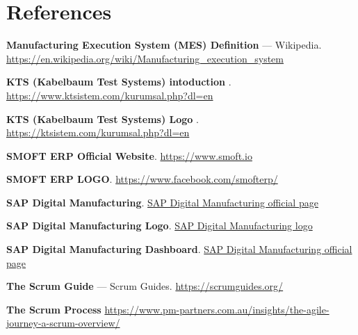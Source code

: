 \chapter*{References}

\begin{enumerate}[label={[\arabic*]},leftmargin=*]
    \item \label{ref:MESdefinition} \textbf{Manufacturing Execution System (MES) Definition} --- Wikipedia.
    \url{https://en.wikipedia.org/wiki/Manufacturing_execution_system}

    \item \label{ref:KTSintro} \textbf{KTS (Kabelbaum Test Systems) intoduction} .
    \url{https://www.ktsistem.com/kurumsal.php?dl=en}

    \item \label{ref:KTSlogo} \textbf{KTS (Kabelbaum Test Systems) Logo} .
    \url{https://ktsistem.com/kurumsal.php?dl=en}
    
    \item \label{ref:SMOFT} \textbf{SMOFT ERP Official Website}.
    \href{https://www.smoft.io}{https://www.smoft.io}

    \item \label{ref:SMOFT-LOGO} \textbf{SMOFT ERP LOGO}.
    \url{https://www.facebook.com/smofterp/}

    \item \label{ref:SAPDM} \textbf{SAP Digital Manufacturing}.
    \href{https://www.sap.com/products/scm/digital-manufacturing.html}{SAP Digital Manufacturing official page}

    \item \label{ref:SAPDM-LOGO} \textbf{SAP Digital Manufacturing Logo}.
    \href{https://www.linkedin.com/posts/manoelfranklin_unlock-the-power-of-sap-digital-manufacturing-activity-7114950720767836161-D_I9}{SAP Digital Manufacturing logo}

    \item \label{ref:SAPDM-DASHBOARD} \textbf{SAP Digital Manufacturing Dashboard}.
    \href{https://www.sap.com/products/scm/digital-manufacturing.html}{SAP Digital Manufacturing official page}

    \item \label{ref:scrumguide} \textbf{The Scrum Guide} --- Scrum Guides. 
    \url{https://scrumguides.org/}

    \item \label{ref:scrum-Process} \textbf{The Scrum Process}  
    \url{https://www.pm-partners.com.au/insights/the-agile-journey-a-scrum-overview/}


\end{enumerate}
